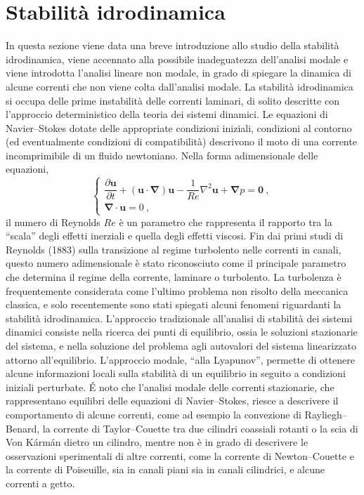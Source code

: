 \section{Stabilità idrodinamica}

In questa sezione viene data una breve introduzione allo studio della stabilità idrodinamica, viene accennato alla possibile inadeguatezza dell'analisi modale e viene introdotta l'analisi lineare non modale, in grado di spiegare la dinamica di alcune correnti che non viene colta dall'analisi modale.
%
\newline
La stabilità idrodinamica si occupa delle prime instabilità delle correnti laminari, di solito descritte con l'approccio deterministico della teoria dei sistemi dinamici. Le equazioni di Navier--Stokes dotate delle appropriate condizioni iniziali, condizioni al contorno (ed eventualmente condizioni di compatibilità) descrivono il moto di una corrente incomprimibile di un fluido newtoniano. Nella forma adimensionale delle equazioni,
\begin{equation}
 \begin{cases}
  \dfrac{\partial \bm{u}}{\partial t} + (\bm{u} \cdot \bm{\nabla} ) \bm{u}
  -\dfrac{1}{Re} \nabla^2 \bm{u} + \bm{\nabla} p = \bm{0} \ , \\
  \bm{\nabla} \cdot \bm{u} = 0 \ ,
 \end{cases}
\end{equation}
il numero di Reynolds $Re$ è un parametro che rappresenta il rapporto tra la ``scala'' degli effetti inerziali e quella degli effetti viscosi. Fin dai primi studi di Reynolds (1883) sulla transizione al regime turbolento nelle correnti in canali, questo numero adimensionale è stato riconosciuto come il principale parametro che determina il regime della corrente, laminare o turbolento.
%
\vspace{0.3cm}
\newline
La turbolenza è frequentemente considerata come l'ultimo problema non risolto della meccanica classica, e solo recentemente sono stati spiegati alcuni fenomeni riguardanti la stabilità idrodinamica. L'approccio tradizionale all'analisi di stabilità dei sistemi dinamici consiste nella ricerca dei punti di equilibrio, ossia le soluzioni stazionarie del sistema, e nella soluzione del problema agli autovalori del sistema linearizzato attorno all'equilibrio. L'approccio modale, ``alla Lyapunov'', permette di ottenere alcune informazioni locali sulla stabilità di un equilibrio in seguito a condizioni iniziali perturbate.
\'E noto che l'analisi modale delle correnti stazionarie, che rappresentano equilibri delle equazioni di Navier--Stokes, riesce a descrivere il comportamento di alcune correnti, come ad esempio la convezione di Rayliegh--Benard, la corrente di Taylor--Couette tra due cilindri coassiali rotanti o la scia di Von K\'arm\'an dietro un cilindro, mentre non è in grado di descrivere le osservazioni sperimentali di altre correnti, come la corrente di Newton--Couette e la corrente di Poiseuille, sia in canali piani sia in canali cilindrici, e alcune correnti a getto.
%
\vspace{0.3cm}
\newline
